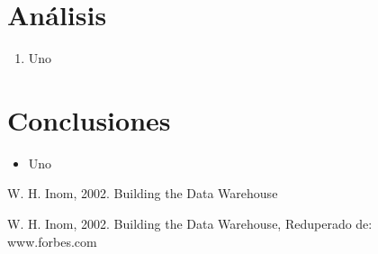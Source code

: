 \documentclass[twoside,twocolumn]{article}
\begin{document}

\section{Análisis}

\begin{enumerate}

    \item Uno
\end{enumerate}


\section{Conclusiones}
\begin{itemize}	
 \item Uno

\end{itemize} 





\begin{thebibliography}{99} 

\bibitem[1]{}
\newblock W. H. Inom, 2002. Building the Data Warehouse

\bibitem[2]{}
\newblock W. H. Inom, 2002. Building the Data Warehouse, Reduperado de: www.forbes.com


\end{thebibliography}


\end{document}
